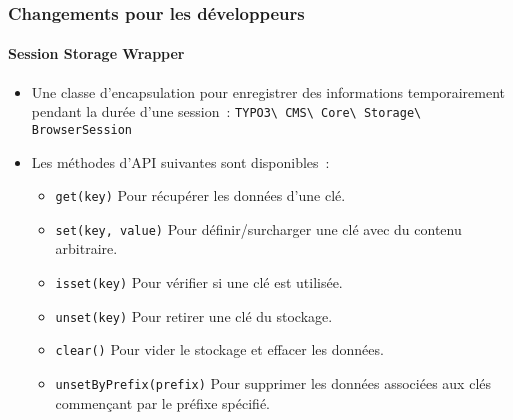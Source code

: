 %

\begin{frame}[fragile]
	\frametitle{Changements pour les développeurs}
	\framesubtitle{Session Storage Wrapper}


	\begin{itemize}
		\item Une classe d'encapsulation pour enregistrer des informations temporairement
			pendant la durée d'une session~:
			\smaller\texttt{TYPO3\textbackslash
				CMS\textbackslash
				Core\textbackslash
				Storage\textbackslash
				BrowserSession}\normalsize
		\item Les méthodes d'API suivantes sont disponibles~:
			\vspace{0.1cm}
			\begin{itemize}\smaller
				\item \texttt{get(key)}\newline
					Pour récupérer les données d'une clé.
				\item \texttt{set(key, value)}\newline
					Pour définir/surcharger une clé avec du contenu arbitraire.
				\item \texttt{isset(key)}\newline
					Pour vérifier si une clé est utilisée.
				\item \texttt{unset(key)}\newline
					Pour retirer une clé du stockage.
				\item \texttt{clear()}\newline
					Pour vider le stockage et effacer les données.
				\item \texttt{unsetByPrefix(prefix)}\newline
				 	Pour supprimer les données associées aux clés commençant par le préfixe spécifié.
			\end{itemize}\normalsize

	\end{itemize}

\end{frame}

